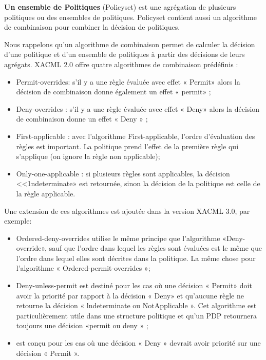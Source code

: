 \hspace*{0.5cm} \textbf{Un ensemble de Politiques} (Policyset) est une agrégation de plusieurs politiques ou des ensembles de politiques. Policyset contient aussi un algorithme de combinaison pour combiner la décision de politiques. 


\label{sectionAlgo}

Nous rappelons qu'un algorithme de combinaison permet de calculer la décision d'une politique et d'un ensemble de politiques à partir des décisions de leurs agrégats. XACML 2.0 offre quatre algorithmes de combinaison prédéfinis \cite{anderson03} :
\begin{itemize}
\item Permit-overrides: s'il y a une règle évaluée avec effet « Permit» alors la
décision de combinaison donne également un effet « permit» ;
\item Deny-overrides : s'il y a une règle évaluée avec effet « Deny» alors la
décision de combinaison donne un effet « Deny » ;
\item First-applicable : avec l'algorithme First-applicable, l'ordre d'évaluation des
règles est important. La politique prend l'effet de la première règle qui
s'applique (on ignore la règle non applicable);
\item Only-one-applicable : si plusieurs règles sont applicables, la décision
<<1ndeterminate» est retournée, sinon la décision de la politique est celle de la
règle applicable.
\end{itemize}

\hspace*{0.5cm} Une extension de ces algorithmes est ajoutée dans la version XACML 3.0, par exemple:

\begin{itemize}
\item Ordered-deny-overrides utilise le même principe que l'algorithme «Deny-override», sauf que l'ordre dans lequel les règles sont évaluées est le même que l'ordre dans lequel elles sont décrites dans la politique. La même chose pour l'algorithme « Ordered-permit-overrides »;
\item Deny-unless-permit est destiné pour les cas où une décision « Permit» doit avoir la priorité par rapport à la décision « Deny» et qu'aucune règle ne retourne la décision « lndeterminate ou NotApplicable ». Cet algorithme est particulièrement utile dans une structure politique et qu'un PDP retournera toujours une décision «permit ou deny » ;
\item est conçu pour les cas où une décision « Deny » devrait avoir priorité sur une décision « Permit ». 
\end{itemize}

